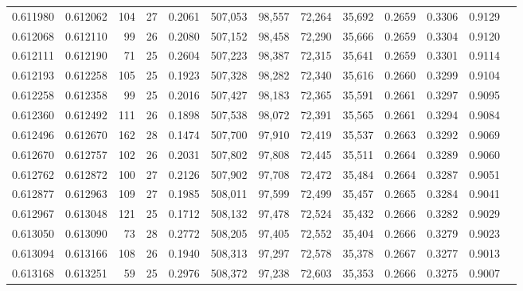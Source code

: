 \begin{tabular}{rrrrrrrrrrrrr}
0.611980 & 0.612062 & 104 &  27 &                                     0.2061 & 507,053 &  98,557 &  72,264 &  35,692 & 0.2659 & 0.3306 & 0.9129 \\
0.612068 & 0.612110 &  99 &  26 &                                     0.2080 & 507,152 &  98,458 &  72,290 &  35,666 & 0.2659 & 0.3304 & 0.9120 \\
0.612111 & 0.612190 &  71 &  25 &                                     0.2604 & 507,223 &  98,387 &  72,315 &  35,641 & 0.2659 & 0.3301 & 0.9114 \\
0.612193 & 0.612258 & 105 &  25 &                                     0.1923 & 507,328 &  98,282 &  72,340 &  35,616 & 0.2660 & 0.3299 & 0.9104 \\
0.612258 & 0.612358 &  99 &  25 &                                     0.2016 & 507,427 &  98,183 &  72,365 &  35,591 & 0.2661 & 0.3297 & 0.9095 \\
0.612360 & 0.612492 & 111 &  26 &                                     0.1898 & 507,538 &  98,072 &  72,391 &  35,565 & 0.2661 & 0.3294 & 0.9084 \\
0.612496 & 0.612670 & 162 &  28 &                                     0.1474 & 507,700 &  97,910 &  72,419 &  35,537 & 0.2663 & 0.3292 & 0.9069 \\
0.612670 & 0.612757 & 102 &  26 &                                     0.2031 & 507,802 &  97,808 &  72,445 &  35,511 & 0.2664 & 0.3289 & 0.9060 \\
0.612762 & 0.612872 & 100 &  27 &                                     0.2126 & 507,902 &  97,708 &  72,472 &  35,484 & 0.2664 & 0.3287 & 0.9051 \\
0.612877 & 0.612963 & 109 &  27 &                                     0.1985 & 508,011 &  97,599 &  72,499 &  35,457 & 0.2665 & 0.3284 & 0.9041 \\
0.612967 & 0.613048 & 121 &  25 &                                     0.1712 & 508,132 &  97,478 &  72,524 &  35,432 & 0.2666 & 0.3282 & 0.9029 \\
0.613050 & 0.613090 &  73 &  28 &                                     0.2772 & 508,205 &  97,405 &  72,552 &  35,404 & 0.2666 & 0.3279 & 0.9023 \\
0.613094 & 0.613166 & 108 &  26 &                                     0.1940 & 508,313 &  97,297 &  72,578 &  35,378 & 0.2667 & 0.3277 & 0.9013 \\
0.613168 & 0.613251 &  59 &  25 &                                     0.2976 & 508,372 &  97,238 &  72,603 &  35,353 & 0.2666 & 0.3275 & 0.9007 \\

\end{tabular}
